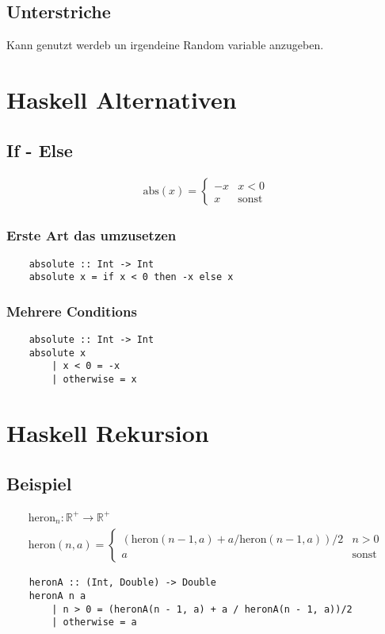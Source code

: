 \documentclass[a4paper]{article}
\newcommand*{\R}{\mathbb{R}} %
\begin{document}
\subsection{Unterstriche}
Kann genutzt werdeb un irgendeine Random variable anzugeben.


\section{Haskell Alternativen}

\subsection{If - Else}
\begin{align*}
    \text{abs}(x) = \begin{cases}
        -x & x < 0 \\
        x & \text{sonst}
    \end{cases}
\end{align*}
\subsubsection{Erste Art das umzusetzen}
\begin{verbatim}
    absolute :: Int -> Int
    absolute x = if x < 0 then -x else x
\end{verbatim}
\subsubsection{Mehrere Conditions}
\begin{verbatim}
    absolute :: Int -> Int
    absolute x
        | x < 0 = -x
        | otherwise = x
\end{verbatim}

\section{Haskell Rekursion}

\subsection{Beispiel}
\begin{align*}
    \text{heron}_n : \R^+ \rightarrow \R^+ \\
    \text{heron}(n,a) = \begin{cases}
        (\text{heron}(n - 1, a) + a/\text{heron}(n-1,a))/2 & n > 0 \\
        a & \text{sonst}
    \end{cases}
\end{align*}
\begin{verbatim}
    heronA :: (Int, Double) -> Double
    heronA n a
        | n > 0 = (heronA(n - 1, a) + a / heronA(n - 1, a))/2
        | otherwise = a
\end{verbatim}
\end{document}
